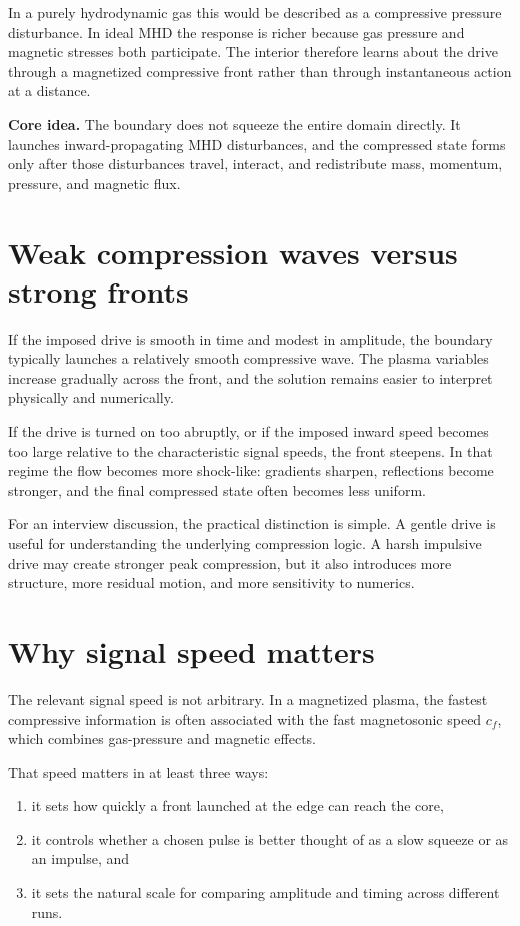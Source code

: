\documentclass[11pt]{article}
\begin{document}
In a purely hydrodynamic gas this would be described as a compressive pressure disturbance. In ideal MHD the response is richer because gas pressure and magnetic stresses both participate. The interior therefore learns about the drive through a magnetized compressive front rather than through instantaneous action at a distance.

\begin{physicsbox}
\textbf{Core idea.} The boundary does not squeeze the entire domain directly. It launches inward-propagating MHD disturbances, and the compressed state forms only after those disturbances travel, interact, and redistribute mass, momentum, pressure, and magnetic flux.
\end{physicsbox}

\section{Weak compression waves versus strong fronts}
If the imposed drive is smooth in time and modest in amplitude, the boundary typically launches a relatively smooth compressive wave. The plasma variables increase gradually across the front, and the solution remains easier to interpret physically and numerically.

If the drive is turned on too abruptly, or if the imposed inward speed becomes too large relative to the characteristic signal speeds, the front steepens. In that regime the flow becomes more shock-like: gradients sharpen, reflections become stronger, and the final compressed state often becomes less uniform.

For an interview discussion, the practical distinction is simple. A gentle drive is useful for understanding the underlying compression logic. A harsh impulsive drive may create stronger peak compression, but it also introduces more structure, more residual motion, and more sensitivity to numerics.

\section{Why signal speed matters}
The relevant signal speed is not arbitrary. In a magnetized plasma, the fastest compressive information is often associated with the fast magnetosonic speed $c_f$, which combines gas-pressure and magnetic effects.

That speed matters in at least three ways:
\begin{enumerate}
    \item it sets how quickly a front launched at the edge can reach the core,
    \item it controls whether a chosen pulse is better thought of as a slow squeeze or as an impulse, and
    \item it sets the natural scale for comparing amplitude and timing across different runs.
\end{enumerate}
\end{document}
